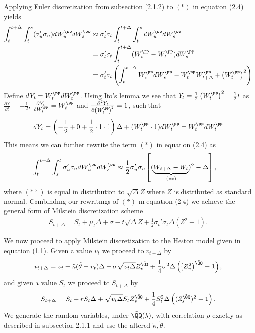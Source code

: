\documentclass[11pt]{article}
\numberwithin{equation}{section}
\begin{document}
Applying Euler discretization from subsection (2.1.2) to $(*)$ in equation (2.4)
yields
\begin{align*}
    \int_t^{t+\Delta}\int_t^s (\sigma_u'\sigma_u)dW_u^\PP dW_s^\PP &\approx \sigma_t'\sigma_t \int_t^{t+\Delta}\int_t^s dW_u^\PP dW_s^\PP\\
    &=\sigma_t'\sigma_t \int_t^{t+\Delta}(W_s^\PP-W_t^\PP) dW_s^\PP\\
    &=\sigma_t'\sigma_t \left (\int_t^{t+\Delta} W_s^\PP d W_s^\PP-W_t^\PP W_{t+\Delta}^\PP+ \left(W_t^\PP\right)^2 \right )
\end{align*}
Define $dY_t=W_t^\PP dW_t^\PP$. Using Itō's lemma we see that
$Y_t=\frac{1}{2}\left ( W_t^\PP \right)^2-\frac{1}{2}t$ as $\frac{\partial Y}{\partial
t}=-\frac{1}{2}$, $\frac{\partial Y_t}{\partial
W_t ^\PP}=W_t ^\PP$ and $\frac{\partial ^2 Y_t}{\partial \left ( W_t ^\PP\right )^2}=1$, such that
\begin{align*}
    dY_t=\left( -\frac{1}{2}+0+\frac{1}{2}\cdot 1 \cdot 1\right)\Delta+(W_t^\PP \cdot 1)dW_t^\PP=W_t^\PP dW_t ^\PP
\end{align*}
This means we can further rewrite the term $(*)$ in equation (2.4) as
\begin{align*}
    \int_t^{t+\Delta}\int_s^t \sigma_u'\sigma_u dW_u^\PP dW_s^\PP&\approx \frac{1}{2}\sigma_u'\sigma_u \left [ (\underbrace{W_{t+\Delta}-W_t}_{(**)})^2-\Delta \right ],
\end{align*}
where $(**)$ is equal in distribution to $\sqrt{\Delta}Z$ where $Z$ is distributed
as standard normal. Combinding our rewritings of $(*)$ in equation (2.4) we
achieve the general form of Milstein discretization scheme
\begin{align}
    S_{t+\Delta}=S_t+\mu_t \Delta +\sigma-t \sqrt{\Delta}Z+\frac{1}{2}\sigma_t'\sigma_t \Delta \left( Z^2-1\right).
\end{align}

We now proceed to apply Milstein discretization to the Heston model given in
equation (1.1). Given a value $v_t$ we proceed to $v_{t+\Delta}$ by
\begin{align*}
    v_{t+\Delta}=v_t+\tilde{\kappa}(\tilde{\theta}-v_t)\Delta+\sigma \sqrt{v_t \Delta}Z_v^{\tilde{\QQ}}+\frac{1}{4}\sigma^2\Delta\left( \left ( Z_v^2 \right)^{\tilde{\QQ}}-1\right),
\end{align*}
and given a value $S_t$ we proceed to $S_{t+\Delta}$ by 
\begin{align*}
    S_{t+\Delta}=S_t+r S_t \Delta + \sqrt{v_t \Delta} S_tZ_s^{\tilde{\QQ}}+\frac{1}{4}S_t^2\Delta \left ( (Z_s^{\tilde{\QQ}})^2-1\right ).
\end{align*}
We generate the random variables, under $\tilde{\QQ}(\lambda)$, with correlation
$\rho$ exactly as described in subsection 2.1.1 and use the altered
$\tilde{\kappa},\tilde{\theta}$.
\end{document}
